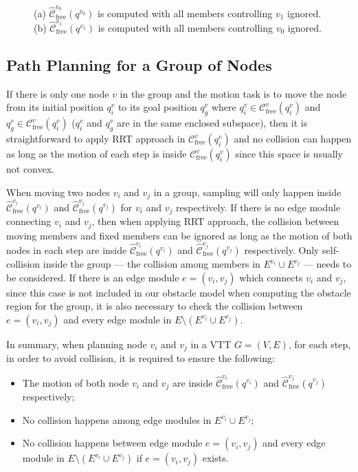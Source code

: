 \documentclass[journal]{IEEEtran}
\begin{document}
\begin{figure}[t]
  \centering
  \hfil
  \caption{(a) $\widehat{\mathcal{C}}_{\mathrm{free}}^{v_0}(q^{v_0})$ is
    computed with all members controlling $v_1$ ignored. (b)
    $\widehat{\mathcal{C}}_{\mathrm{free}}^{v_1}(q^{v_1})$ is computed with all
    members controlling $v_0$ ignored.}
  \label{fig:c-free-group-node-shrink}
\end{figure}

\subsection{Path Planning for a Group of Nodes}
\label{sec:path-planning}
If there is only one node $v$ in the group and the motion task is to
move the node from its initial position $q_i^v$ to its goal position
$q_g^v$ where $q_i^v\in \mathcal{C}_{\mathrm{free}}^v(q^v_i)$ and
$q_g^v\in \mathcal{C}_{\mathrm{free}}^v(q^v_i)$ ($q_i^v$ and $q_g^v$
are in the same enclosed subspace), then it is straightforward to
apply RRT approach in $\mathcal{C}_{\mathrm{free}}^v(q^v_i)$ and no
collision can happen as long as the motion of each step is inside
$\mathcal{C}_{\mathrm{free}}^v(q^v_i)$ since this space is usually not
convex.

When moving two nodes $v_i$ and $v_j$ in a group, sampling will only
happen inside $\widehat{\mathcal{C}}_{\mathrm{free}}^{v_i}(q^{v_i})$
and $\widehat{\mathcal{C}}_{\mathrm{free}}^{v_j}(q^{v_j})$ for $v_i$
and $v_j$ respectively. If there is no edge module connecting $v_i$
and $v_j$, then when applying RRT approach, the collision between
moving members and fixed members can be ignored as long as the motion
of both nodes in each step are inside
$\widehat{\mathcal{C}}_{\mathrm{free}}^{v_i}(q^{v_i})$ and
$\widehat{\mathcal{C}}_{\mathrm{free}}^{v_j}(q^{v_j})$
respectively. Only self-collision inside the group --- the collision
among members in $E^{v_i}\cup E^{v_j}$ --- needs to be considered. If
there is an edge module $e=(v_i, v_j)$ which connects $v_i$ and $v_j$,
since this case is not included in our obstacle model when computing
the obstacle region for the group, it is also necessary to check the
collision between $e = (v_i, v_j)$ and every edge module in
$E\setminus (E^{v_i}\cup E^{v_j})$.

In summary, when planning node $v_i$ and $v_j$ in a VTT $G = (V, E)$,
for each step, in order to avoid collision, it is required to ensure
the following:
\begin{itemize}
\item The motion of both node $v_i$ and $v_j$ are inside
  $\widehat{\mathcal{C}}_{\mathrm{free}}^{v_i}(q^{v_i})$ and
  $\widehat{\mathcal{C}}_{\mathrm{free}}^{v_j}(q^{v_j})$ respectively;
\item No collision happens among edge modules in
  $E^{v_i}\cup E^{v_j}$;
\item No collision happens between edge module $e=(v_i, v_j)$ and
  every edge module in $E\setminus(E^{v_i}\cup E^{v_j})$ if
  $e=(v_i, v_j)$ exists.
\end{itemize}
\end{document}
